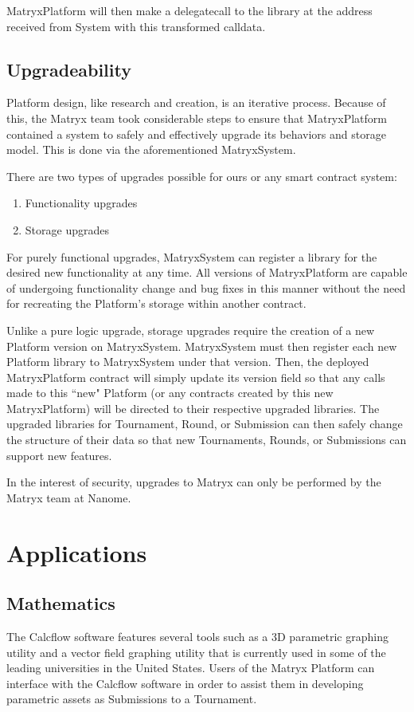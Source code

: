 \documentclass[a4paper, 10pt, conference]{ieeeconf}      %
\begin{document}
MatryxPlatform will then make a delegatecall to the library at the address received from System with this transformed calldata.

\subsection{Upgradeability}\label{upgradeability}
Platform design, like research and creation, is an iterative process. Because of this, the Matryx team took considerable steps to ensure that MatryxPlatform contained a system to safely and effectively upgrade its behaviors and storage model.
This is done via the aforementioned MatryxSystem.

There are two types of upgrades possible for ours or any smart contract system:
\begin{enumerate}
\item Functionality upgrades
\item Storage upgrades
\end{enumerate}
For purely functional upgrades, MatryxSystem can register a library for the desired new functionality at any time. All versions of MatryxPlatform are capable of undergoing functionality change and bug fixes in this manner without the need for recreating the Platform’s storage within another contract. 

Unlike a pure logic upgrade, storage upgrades require the creation of a new Platform version on MatryxSystem. MatryxSystem must then register each new Platform library to MatryxSystem under that version. Then, the deployed MatryxPlatform contract will simply update its version field so that any calls made to this ``new" Platform (or any contracts created by this new MatryxPlatform) will be directed to their respective upgraded libraries. The upgraded libraries for Tournament, Round, or Submission can then safely change the structure of their data so that new Tournaments, Rounds, or Submissions can support new features.

In the interest of security, upgrades to Matryx can only be performed by the Matryx team at Nanome.


\section{Applications}\label{applications}

\subsection{Mathematics}\label{mathematics}
The Calcflow software features several tools such as a 3D parametric graphing utility and a vector field graphing utility that is currently used in some of the leading universities in the United States. 
Users of the Matryx Platform can interface with the Calcflow software in order to assist them in developing parametric assets as Submissions to a Tournament.
\end{document}
